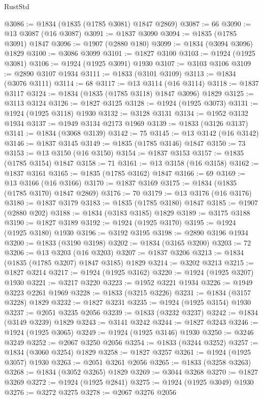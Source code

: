 \begin{lexlean}{RustStd}
\begin{coremodule}
@3086 := @1834 (@1835 (@1785 @3081) @1847 @2869)
@3087 := 66
@3090 := @13 @3087 (@16 @3087)
@3091 := @1837 @3090
@3094 := @1835 (@1785 @3091) @1847
@3096 := @1907 (@2880 @180)
@3099 := @1834 (@3094 @3096) @1829
@3100 := @3086 @3099
@3101 := @1827 @3100
@3103 := @1924 (@1925 @3081)
@3106 := @1924 (@1925 @3091) @1930
@3107 := @3103 @3106
@3109 := @2890 @3107 @1934
@3111 := @1833 (@3101 @3109)
@3113 := @1834 (@3076 @3111)
@3114 := 68
@3117 := @13 @3114 (@16 @3114)
@3118 := @1837 @3117
@3124 := @1834 (@1835 (@1785 @3118) @1847 @3096) @1829
@3125 := @3113 @3124
@3126 := @1827 @3125
@3128 := @1924 (@1925 @3073)
@3131 := @1924 (@1925 @3118) @1930
@3132 := @3128 @3131
@3134 := @1952 @3132 @1934
@3137 := @1949 @3134 @2173 @1969
@3139 := @1833 (@3126 @3137)
@3141 := @1834 (@3068 @3139)
@3142 := 75
@3145 := @13 @3142 (@16 @3142)
@3146 := @1837 @3145
@3149 := @1835 (@1785 @3146) @1847
@3150 := 73
@3153 := @13 @3150 (@16 @3150)
@3154 := @1837 @3153
@3157 := @1835 (@1785 @3154) @1847
@3158 := 71
@3161 := @13 @3158 (@16 @3158)
@3162 := @1837 @3161
@3165 := @1835 (@1785 @3162) @1847
@3166 := 69
@3169 := @13 @3166 (@16 @3166)
@3170 := @1837 @3169
@3175 := @1834 (@1835 (@1785 @3170) @1847 @2869)
@3176 := 70
@3179 := @13 @3176 (@16 @3176)
@3180 := @1837 @3179
@3183 := @1835 (@1785 @3180) @1847
@3185 := @1907 (@2880 @202)
@3188 := @1834 (@3183 @3185) @1829
@3189 := @3175 @3188
@3190 := @1827 @3189
@3192 := @1924 (@1925 @3170)
@3195 := @1924 (@1925 @3180) @1930
@3196 := @3192 @3195
@3198 := @2890 @3196 @1934
@3200 := @1833 (@3190 @3198)
@3202 := @1834 (@3165 @3200)
@3203 := 72
@3206 := @13 @3203 (@16 @3203)
@3207 := @1837 @3206
@3213 := @1834 (@1835 (@1785 @3207) @1847 @3185) @1829
@3214 := @3202 @3213
@3215 := @1827 @3214
@3217 := @1924 (@1925 @3162)
@3220 := @1924 (@1925 @3207) @1930
@3221 := @3217 @3220
@3223 := @1952 @3221 @1934
@3226 := @1949 @3223 @2261 @1969
@3228 := @1833 (@3215 @3226)
@3231 := @1834 (@3157 @3228) @1829
@3232 := @1827 @3231
@3235 := @1924 (@1925 @3154) @1930
@3237 := @2051 @3235 @2056
@3239 := @1833 (@3232 @3237)
@3242 := @1834 (@3149 @3239) @1829
@3243 := @3141 @3242
@3244 := @1827 @3243
@3246 := @1924 (@1925 @3065)
@3249 := @1924 (@1925 @3146) @1930
@3250 := @3246 @3249
@3252 := @2067 @3250 @2056
@3254 := @1833 (@3244 @3252)
@3257 := @1834 (@3060 @3254) @1829
@3258 := @1827 @3257
@3261 := @1924 (@1925 @3057) @1930
@3263 := @2051 @3261 @2056
@3265 := @1833 (@3258 @3263)
@3268 := @1834 (@3052 @3265) @1829
@3269 := @3044 @3268
@3270 := @1827 @3269
@3272 := @1924 (@1925 @2841)
@3275 := @1924 (@1925 @3049) @1930
@3276 := @3272 @3275
@3278 := @2067 @3276 @2056

\end{coremodule}
\end{lexlean}
